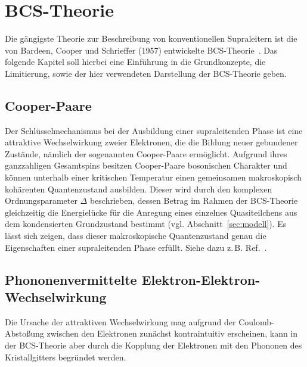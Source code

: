 \section{BCS-Theorie}

Die gängigste Theorie zur Beschreibung von konventionellen Supraleitern ist die von Bardeen, Cooper und Schrieffer (1957) entwickelte BCS-Theorie~\cite{bardeen_theory_1957,tinkham_introduction_2004}. 
Das folgende Kapitel soll hierbei eine Einführung in die Grundkonzepte, die Limitierung, sowie der hier verwendeten Darstellung der BCS-Theorie geben. 

\subsection{Cooper-Paare}

Der Schlüsselmechanismus bei der Ausbildung einer supraleitenden Phase ist eine attraktive Wechselwirkung zweier Elektronen, die die Bildung  neuer gebundener Zustände, nämlich der sogenannten Cooper-Paare ermöglicht. 
Aufgrund ihres ganzzahligen Gesamtspins besitzen Cooper-Paare bosonischen Charakter und können unterhalb einer kritischen Temperatur einen gemeinsamen makroskopisch kohärenten Quantenzustand ausbilden.
Dieser wird durch den komplexen Ordnungsparameter $\Delta$ beschrieben, dessen Betrag im Rahmen der BCS-Theorie gleichzeitig die Energielücke für die Anregung eines einzelnes Quasiteilchens aus dem kondensierten Grundzustand bestimmt (vgl. Abschnitt~\ref{sec:modell}).
Es lässt sich zeigen, dass dieser makroskopische Quantenzustand genau die Eigenschaften einer supraleitenden Phase erfüllt.
Siehe dazu z.\,B. Ref.~\cite{tinkham_introduction_2004}.


\subsection{Phononenvermittelte Elektron-Elektron-Wechselwirkung}
Die Ursache der attraktiven Wechselwirkung mag aufgrund der Coulomb-Abstoßung zwischen den Elektronen zunächst kontraintuitiv erscheinen, kann in der BCS-Theorie aber durch die Kopplung der Elektronen mit den Phononen des Kristallgitters begründet werden. \\

